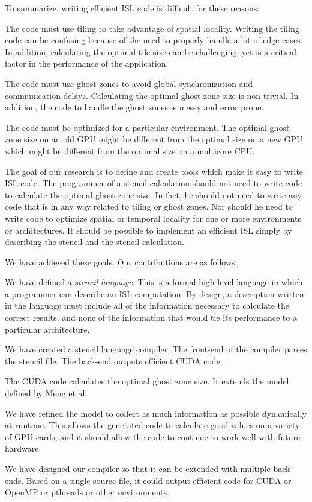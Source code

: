 \documentclass{styles/sig-alternate}
\begin{document}
To summarize, writing efficient ISL code is difficult for these reasons:
\begin{itemize*}
\item The code must use tiling to take advantage of spatial locality.
  Writing the tiling code can be confusing because of the need to 
  properly handle a lot of edge cases.  In addition, calculating the 
  optimal tile size can be challenging, yet is a critical factor 
  in the performance of the application.
\item The code must use ghost zones to avoid global synchronization and 
  communication delays.  Calculating the optimal ghost zone size is 
  non-trivial.  In addition, the code to handle the ghost zones is
  messy and error prone.
\item The code must be optimized for a particular environment.  The
  optimal ghost zone size on an old GPU might be different from the
  optimal size on a new GPU which might be different from the optimal
  size on a multicore CPU.
\end{itemize*}

The goal of our research is to define and create tools which make it
easy to write ISL code.  The programmer of a stencil calculation
should not need to write code to calculate the optimal ghost zone
size.  In fact, he should not need to write any code that is in any
way related to tiling or ghost zones.  Nor should he need to write
code to optimize spatial or temporal locality for one or more
environments or architectures.  It should be possible to implement an
efficient ISL simply by describing the stencil and the stencil
calculation.

We have achieved these goals.  Our contributions are as follows:
\begin{itemize*}
\item We have defined a {\em stencil language}.  This is a formal
  high-level language in which a programmer can describe an ISL
  computation.  By design, a description written in the language must
  include all of the information necessary to calculate the correct
  results, and none of the information that would tie its performance
  to a particular architecture.
\item We have created a stencil language compiler.  The front-end of
  the compiler parses the stencil file.  The back-end outputs
  efficient CUDA code.
\item The CUDA code calculates the optimal ghost zone size.  It
  extends the model defined by Meng et al.
\item We have refined the model to collect as much information as
  possible dynamically at runtime.  This allows the generated code to
  calculate good values on a variety of GPU cards, and it should allow
  the code to continue to work well with future hardware.
\item We have designed our compiler so that it can be extended with
  multiple back-ends.  Based on a single source file, it could output
  efficient code for CUDA or OpenMP or pthreads or other environments.
\end{itemize*}
\end{document}
